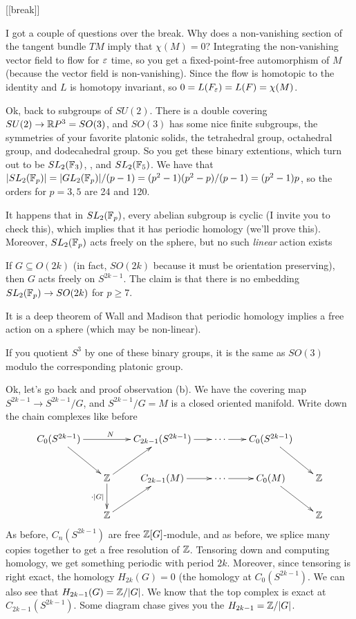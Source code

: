 [[break]]

I got a couple of questions over the break. Why does a non-vanishing section of the tangent bundle $TM$ imply that $\chi(M)=0$? Integrating the non-vanishing vector field to flow for $\varepsilon$ time, so you get a fixed-point-free automorphism of $M$ (because the vector field is non-vanishing). Since the flow is homotopic to the identity and $L$ is homotopy invariant, so $0=L(F_\varepsilon)=L(F)=\chi(M)$.

Ok, back to subgroups of $SU(2)$. There is a double covering $SU(2)\to \mathbb{R} P^3=SO(3)$, and $SO(3)$ has some nice finite subgroups, the symmetries of your favorite platonic solids, the tetrahedral group, octahedral group, and dodecahedral group. So you get these binary extentions, which turn out to be $SL_2(\mathbb{F}_3)$, , and $SL_2(\mathbb{F}_5)$. We have that $|SL_2(\mathbb{F}_p)|=|GL_2(\mathbb{F}_p)|/(p-1)=(p^2-1)(p^2-p)/(p-1)=(p^2-1)p$, so the orders for $p=3,5$ are 24 and 120.

It happens that in $SL_2(\mathbb{F}_p)$, every abelian subgroup is cyclic (I invite you to check this), which implies that it has periodic homology (we'll prove this). Moreover, $SL_2(\mathbb{F}_p)$ acts freely on the sphere, but no such \emph{linear} action exists

If $G\subseteq O(2k)$ (in fact, $SO(2k)$ because it must be orientation preserving), then $G$ acts freely on $S^{2k-1}$. The claim is that there is no embedding $SL_2(\mathbb{F}_p)\to SO(2k)$ for $p\ge 7$.

It is a deep theorem of Wall and Madison that periodic homology implies a free action on a sphere (which may be non-linear).

If you quotient $S^3$ by one of these binary groups, it is the same as $SO(3)$ modulo the corresponding platonic group.

\smallskip

Ok, let's go back and proof observation (b). We have the covering map $S^{2k-1}\to S^{2k-1}/G$, and $S^{2k-1}/G=M$ is a closed oriented manifold. Write down the chain complexes like before
\[\xymatrix@C-.5pc{
  C_0(S^{2k-1})\ar[dr]\ar[rr]^N & & C_{2k-1}(S^{2k-1})\ar[r] & \cdots \ar[r] & C_0(S^{2k-1})\ar[dr]\\
 & \ZZ\ar[ur] \ar[d]_{\cdot |G|} & C_{2k-1}(M)\ar[r] & \cdots \ar[r] & C_0(M)\ar[dr]& \ZZ\\
 & \ZZ \ar[ur] & & & & \ZZ
}\]
As before, $C_n(S^{2k-1})$ are free $\mathbb{Z}[G]$-module, and as before, we splice many copies together to get a free resolution of $\mathbb{Z}$. Tensoring down and computing homology, we get something periodic with period $2k$. Moreover, since tensoring is right exact, the homology $H_{2k}(G)=0$ (the homology at $C_0(S^{2k-1})$. We can also see that $H_{2k-1}(G)=\mathbb{Z}/|G|$. We know that the top complex is exact at $C_{2k-1}(S^{2k-1})$. Some diagram chase gives you the $H_{2k-1}=\mathbb{Z}/|G|$.





